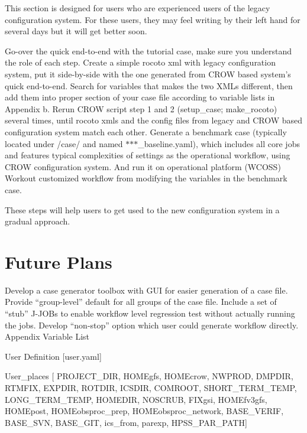 This section is designed for users who are experienced users of the legacy configuration system. For these users, they may feel writing by their left hand for several days but it will get better soon.

Go-\/over the quick end-\/to-\/end with the tutorial case, make sure you understand the role of each step. Create a simple rocoto xml with legacy configuration system, put it side-\/by-\/side with the one generated from C\-R\-O\-W based system’s quick end-\/to-\/end. Search for variables that makes the two X\-M\-Ls different, then add them into proper section of your case file according to variable lists in Appendix b. Rerun C\-R\-O\-W script step 1 and 2 (setup\-\_\-case; make\-\_\-rocoto) several times, until rocoto xmls and the config files from legacy and C\-R\-O\-W based configuration system match each other. Generate a benchmark case (typically located under /case/ and named $\ast$$\ast$$\ast$\-\_\-baseline.yaml), which includes all core jobs and features typical complexities of settings as the operational workflow, using C\-R\-O\-W configuration system. And run it on operational platform (W\-C\-O\-S\-S) Workout customized workflow from modifying the variables in the benchmark case.

These steps will help users to get used to the new configuration system in a gradual approach.

\section*{Future Plans }

Develop a case generator toolbox with G\-U\-I for easier generation of a case file. Provide “group-\/level” default for all groups of the case file. Include a set of “stub” J-\/\-J\-O\-Bs to enable workflow level regression test without actually running the jobs. Develop “non-\/stop” option which user could generate workflow directly. Appendix Variable List

User Definition \mbox{[}user.\-yaml\mbox{]}

User\-\_\-places \mbox{[} P\-R\-O\-J\-E\-C\-T\-\_\-\-D\-I\-R, H\-O\-M\-Egfs, H\-O\-M\-Ecrow, N\-W\-P\-R\-O\-D, D\-M\-P\-D\-I\-R, R\-T\-M\-F\-I\-X, E\-X\-P\-D\-I\-R, R\-O\-T\-D\-I\-R, I\-C\-S\-D\-I\-R, C\-O\-M\-R\-O\-O\-T, S\-H\-O\-R\-T\-\_\-\-T\-E\-R\-M\-\_\-\-T\-E\-M\-P, L\-O\-N\-G\-\_\-\-T\-E\-R\-M\-\_\-\-T\-E\-M\-P, H\-O\-M\-E\-D\-I\-R, N\-O\-S\-C\-R\-U\-B, F\-I\-Xgsi, H\-O\-M\-Efv3gfs, H\-O\-M\-Epost, H\-O\-M\-Eobsproc\-\_\-prep, H\-O\-M\-Eobsproc\-\_\-network, B\-A\-S\-E\-\_\-\-V\-E\-R\-I\-F, B\-A\-S\-E\-\_\-\-S\-V\-N, B\-A\-S\-E\-\_\-\-G\-I\-T, ics\-\_\-from, parexp, H\-P\-S\-S\-\_\-\-P\-A\-R\-\_\-\-P\-A\-T\-H\mbox{]}


